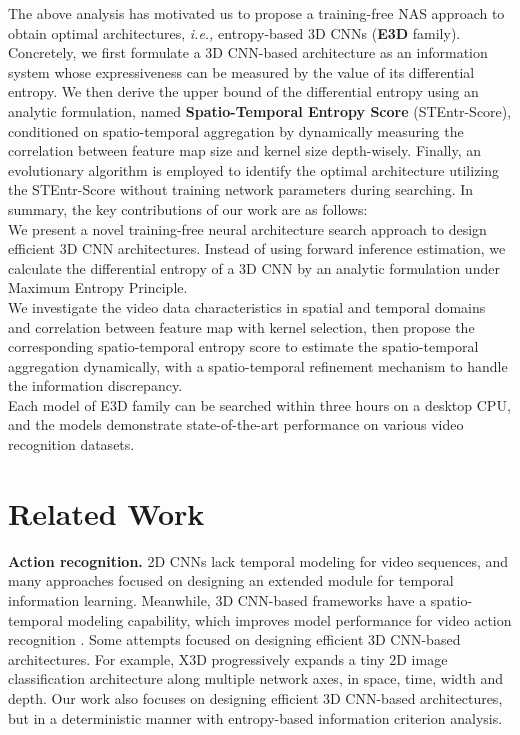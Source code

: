 \documentclass{article} \usepackage{iclr2023_conference,times}
\def\ie{\emph{i.e., }}
\begin{document}
The above analysis has motivated us to propose a training-free NAS approach to obtain optimal architectures, \ie entropy-based 3D CNNs (\textbf{E3D} family).
Concretely, we first formulate a 3D CNN-based architecture as an information system whose expressiveness can be measured by the value of its differential entropy.
We then derive the upper bound of the differential entropy using an analytic formulation, named \textbf{Spatio-Temporal Entropy Score} (STEntr-Score), conditioned on spatio-temporal aggregation by dynamically measuring the correlation between feature map size and kernel size depth-wisely.
Finally, an evolutionary algorithm is employed to identify the optimal architecture utilizing the STEntr-Score without training network parameters during searching. 
In summary, the key contributions of our work are as follows:\\
 We present a novel training-free neural architecture search approach to design efficient 3D CNN architectures. Instead of using forward inference estimation, we calculate the differential entropy of a 3D CNN by an analytic formulation under Maximum Entropy Principle.\\
 We investigate the video data characteristics in spatial and temporal domains  and correlation between feature map with kernel selection, then propose the corresponding spatio-temporal entropy score to estimate the spatio-temporal aggregation dynamically, with a spatio-temporal refinement mechanism to handle the information discrepancy.  \\
 Each model of E3D family can be searched within three hours on a desktop CPU, and the models demonstrate state-of-the-art performance on various video recognition datasets. 





\section{Related Work}



\noindent\textbf{Action recognition.}
2D CNNs lack temporal modeling for video sequences, and many approaches \citep{wang2016tsn,lin2019tsm,li2020tea,wang2021tdn,wang2021actionnet,huang2021tada} focused on designing an extended module for temporal information learning.
Meanwhile, 3D CNN-based frameworks have a spatio-temporal modeling capability, which improves model performance for video action recognition \citep{tran2015c3d,carreira2017i3d,feichtenhofer2020x3d,kondratyuk2021movinets}.
Some attempts \citep{feichtenhofer2020x3d,fan2020rubiksnet,kondratyuk2021movinets} focused on designing efficient 3D CNN-based architectures.
For example, X3D \citep{feichtenhofer2020x3d} progressively expands a tiny 2D image classification architecture along multiple network axes, in space, time, width and depth.
Our work also focuses on designing efficient 3D CNN-based architectures, but in a deterministic manner with entropy-based information criterion analysis.
\end{document}
